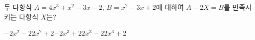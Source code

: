 두 다항식 $A=4x^3+x^2-3x-2$, $B=x^2-3x+2$에 대하여 $A-2X=B$를 만족시키는 다항식 $X$는?
\begin{choices32}{$-2x^2-2$}{$2x^2+2$}{$-2x^3+2$}{$2x^3-2$}{$2x^3+2$}\end{choices32}
